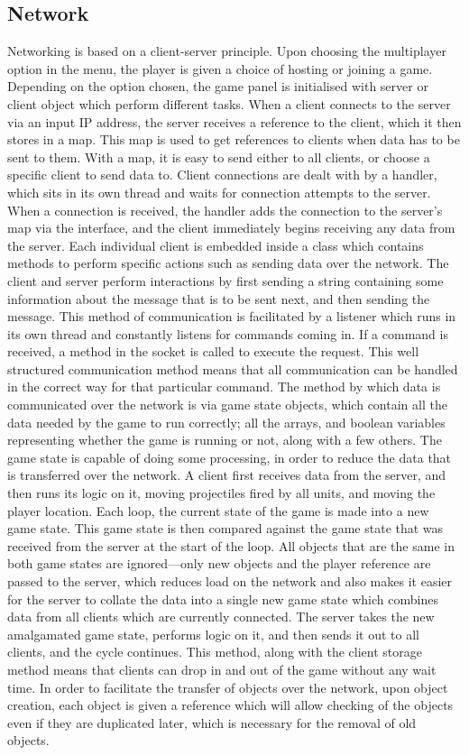 \subsection{Network}
Networking is based on a client-server principle. Upon choosing the multiplayer option in the menu, the player is given a choice of hosting or joining a game. Depending on the option chosen, the game panel is initialised with server or client object which perform different tasks. When a client connects to the server via an input IP address, the server receives a reference to the client, which it then stores in a map. This map is used to get references to clients when data has to be sent to them. With a map, it is easy to send either to all clients, or choose a specific client to send data to. Client connections are dealt with by a handler, which sits in its own thread and waits for connection attempts to the server. When a connection is received, the handler adds the connection to the server's map via the interface, and the client immediately begins receiving any data from the server. Each individual client is embedded inside a class which contains methods to perform specific actions such as sending data over the network. The client and server perform interactions by first sending a string containing some information about the message that is to be sent next, and then sending the message. This method of communication is facilitated by a listener which runs in its own thread and constantly listens for commands coming in. If a command is received, a method in the socket is called to execute the request. This well structured communication method means that all communication can be handled in the correct way for that particular command. The method by which data is communicated over the network is via game state objects, which contain all the data needed by the game to run correctly; all the arrays, and boolean variables representing whether the game is running or not, along with a few others. The game state is capable of doing some processing, in order to reduce the data that is transferred over the network. A client first receives data from the server, and then runs its logic on it, moving projectiles fired by all units, and moving the player location. Each loop, the current state of the game is made into a new game state. This game state is then compared against the game state that was received from the server at the start of the loop. All objects that are the same in both game states are ignored---only new objects and the player reference are passed to the server, which reduces load on the network and also makes it easier for the server to collate the data into a single new game state which combines data from all clients which are currently connected. The server takes the new amalgamated game state, performs logic on it, and then sends it out to all clients, and the cycle continues. This method, along with the client storage method means that clients can drop in and out of the game without any wait time. In order to facilitate the transfer of objects over the network, upon object creation, each object is given a reference which will allow checking of the objects even if they are duplicated later, which is necessary for the removal of old objects.
